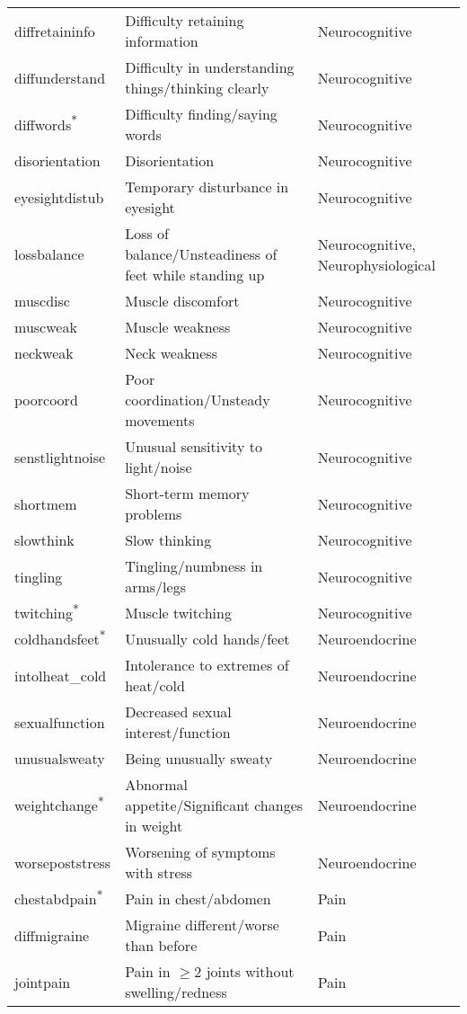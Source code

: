 \begin{tabular}{lll}
diffretaininfo & Difficulty retaining information & Neurocognitive \\
diffunderstand & Difficulty in understanding things/thinking clearly & Neurocognitive \\
diffwords\textsuperscript{${\ast}$} & Difficulty finding/saying words & Neurocognitive \\
disorientation & Disorientation & Neurocognitive \\
eyesightdistub & Temporary disturbance in eyesight & Neurocognitive \\
lossbalance & Loss of balance/Unsteadiness of feet while standing up & Neurocognitive, Neurophysiological \\
muscdisc & Muscle discomfort & Neurocognitive \\
muscweak & Muscle weakness & Neurocognitive \\
neckweak & Neck weakness & Neurocognitive \\
poorcoord & Poor coordination/Unsteady movements & Neurocognitive \\
senstlightnoise & Unusual sensitivity to light/noise & Neurocognitive \\
shortmem & Short-term memory problems & Neurocognitive \\
slowthink & Slow thinking & Neurocognitive \\
tingling & Tingling/numbness in arms/legs & Neurocognitive \\
twitching\textsuperscript{${\ast}$} & Muscle twitching & Neurocognitive \\
coldhandsfeet\textsuperscript{${\ast}$} & Unusually cold hands/feet & Neuroendocrine \\
intolheat\_cold & Intolerance to extremes of heat/cold & Neuroendocrine \\
sexualfunction & Decreased sexual interest/function & Neuroendocrine \\
unusualsweaty & Being unusually sweaty & Neuroendocrine \\
weightchange\textsuperscript{${\ast}$} & Abnormal appetite/Significant changes in weight & Neuroendocrine \\
worsepoststress & Worsening of symptoms with stress & Neuroendocrine \\
chestabdpain\textsuperscript{${\ast}$} & Pain in chest/abdomen & Pain \\
diffmigraine & Migraine different/worse than before & Pain \\
jointpain & Pain in $\geq2$ joints without swelling/redness & Pain \\

\end{tabular}
